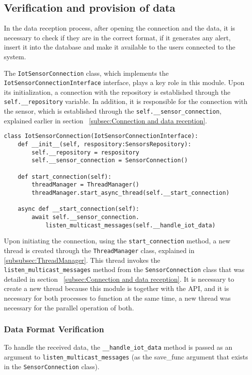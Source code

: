 \subsection[Verification and provision of data]{Verification and provision of data}\label{subsec:checkDataReceived}
In the data reception process, after opening the connection and the data, it is necessary to check if they are in the correct format, if it generates any alert, insert it into the database and make it available to the users connected to the system.

The \texttt{IotSensorConnection} class, which implements the \texttt{IotSensorConnectionInterface} interface, plays a key role in this module. Upon its initialization, a connection with the repository is established through the \texttt{self.\_\_repository} variable. In addition, it is responsible for the connection with the sensor, which is established through the \texttt{self.\_\_sensor\_connection}, explained earlier in section ~\ref{subsec:Connection and data reception}.

\begin{Verbatim}[fontsize=\small, baselinestretch=0.8]
class IotSensorConnection(IotSensorConnectionInterface):
    def __init__(self, respository:SensorsRepository):
        self.__repository = respository
        self.__sensor_connection = SensorConnection()
    
    def start_connection(self):
        threadManager = ThreadManager()
        threadManager.start_async_thread(self.__start_connection)
    
    async def __start_connection(self):
        await self.__sensor_connection.
            listen_multicast_messages(self.__handle_iot_data)
\end{Verbatim}

Upon initiating the connection, using the \texttt{start\_connection} method, a new thread is created through the \texttt{ThreadManager} class, explained in \ref{subsubsec:ThreadManager}. This thread invokes the \texttt{listen\_multicast\_messages} method from the \texttt{SensorConnection} class that was detailed in section ~\ref{subsec:Connection and data reception}. It is necessary to create a new thread because this module is together with the \gls{API}, and it is necessary for both processes to function at the same time, a new thread was necessary for the parallel operation of both.

\subsubsection{Data Format Verification}
To handle the received data, the \texttt{\_\_handle\_iot\_data} method is passed as an argument to \texttt{listen\_multicast\_messages} (as the save\_func argument that exists in the \texttt{SensorConnection} class).

